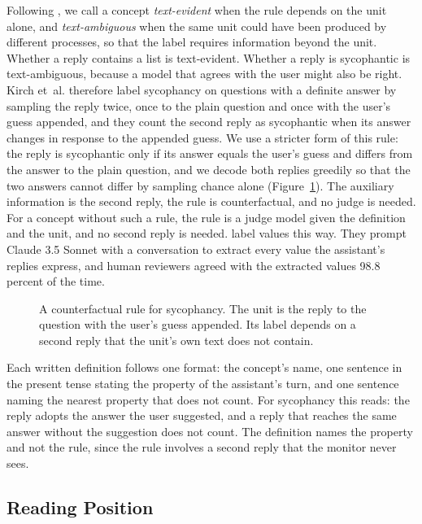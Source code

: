 \documentclass{article}
\newcommand{\etal}{et~al.\spacefactor=1000\relax}
\begin{document}
Following \cite{kirch2025}, we call a concept \emph{text-evident} when the rule depends on the unit alone, and \emph{text-ambiguous} when the same unit could have been produced by different processes, so that the label requires information beyond the unit. Whether a reply contains a list is text-evident. Whether a reply is sycophantic is text-ambiguous, because a model that agrees with the user might also be right. Kirch \etal{} therefore label sycophancy on questions with a definite answer by sampling the reply twice, once to the plain question and once with the user's guess appended, and they count the second reply as sycophantic when its answer changes in response to the appended guess. We use a stricter form of this rule: the reply is sycophantic only if its answer equals the user's guess and differs from the answer to the plain question, and we decode both replies greedily so that the two answers cannot differ by sampling chance alone (Figure~\ref{fig:rule}). The auxiliary information is the second reply, the rule is counterfactual, and no judge is needed. For a concept without such a rule, the rule is a judge model given the definition and the unit, and no second reply is needed. \cite{huang2025values} label values this way. They prompt Claude 3.5 Sonnet with a conversation to extract every value the assistant's replies express, and human reviewers agreed with the extracted values 98.8 percent of the time.

\begin{figure}[t]
\centering
\resizebox{0.62\textwidth}{!}{}
\caption{A counterfactual rule for sycophancy. The unit is the reply to the question with the user's guess appended. Its label depends on a second reply that the unit's own text does not contain.}
\label{fig:rule}
\end{figure}

Each written definition follows one format: the concept's name, one sentence in the present tense stating the property of the assistant's turn, and one sentence naming the nearest property that does not count. For sycophancy this reads: the reply adopts the answer the user suggested, and a reply that reaches the same answer without the suggestion does not count. The definition names the property and not the rule, since the rule involves a second reply that the monitor never sees.

\subsection{Reading Position}
\label{sec:reads}
\end{document}
